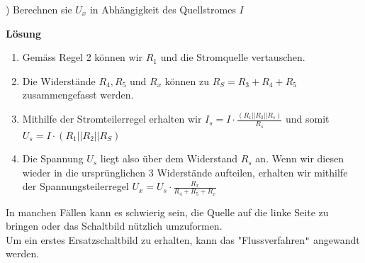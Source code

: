 					) Berechnen sie $U_x$ in Abhängigkeit des Quellstromes $I$
					\begin{center}
						\fix
					\end{center}
					\fix
					 \textbf{Lösung}
				 \begin{enumerate}
  				 \item Gemäss Regel 2 können wir $R_1$ und die Stromquelle vertauschen.
					 \item Die Widerstände $R_4 , R_5$ und $ R_x $ können zu $ R_S = R_3 + R_4 + R_5 $ zusammengefasst werden.
					 \item Mithilfe der Stromteilerregel erhalten wir $ I_s = I \cdot \frac{(R_1 || R_2 || R_s)}{R_s} $ und somit $U_s = I \cdot (R_1 || R_2 || R_S) $
					 \item Die Spannung $U_s$ liegt also über dem Widerstand $R_s$ an. Wenn wir diesen wieder in die ursprünglichen 3 Widerstände aufteilen, erhalten wir mithilfe der Spannungsteilerregel $U_x = U_s \cdot \frac{R_x}{R_4 + R_5 + R_x} $
				 \end{enumerate}

					\iend

					In manchen Fällen kann es schwierig sein, die Quelle auf die linke Seite zu bringen oder das Schaltbild nützlich umzuformen. \\
					Um ein erstes Ersatzschaltbild zu erhalten, kann das "Flussverfahren\texttt{"} angewandt werden.


